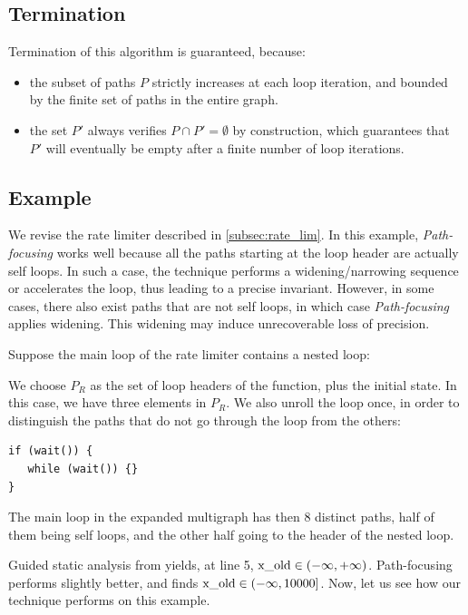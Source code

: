\documentclass[preprint]{sigplanconf}
\begin{document}
\subsection{Termination}
Termination of this algorithm is guaranteed, because:
\begin{itemize}
\item 
the subset of paths $P$ strictly increases at each loop iteration, and bounded by the finite set of
paths in the entire graph. 
\item the set $P'$ always verifies $P \cap P' = \emptyset$ by construction, 
which guarantees that $P'$
will eventually be empty after a finite number of loop iterations.
\end{itemize}

\subsection{Example}

We revise the rate limiter described in \ref{subsec:rate_lim}. In this example,
\emph{Path-focusing} works well because all the paths starting at the
loop header are actually self loops. In such a case, the technique performs a
widening/narrowing sequence or accelerates the loop, thus leading to a precise
invariant. However, in some cases, there also exist paths that are not
self loops, in which case \emph{Path-focusing} applies widening. 
This widening may induce unrecoverable loss of precision.

Suppose the main loop of the rate limiter contains a nested loop:


We choose $P_R$ as the set of loop headers of the function, plus the initial
state. In this case, we have three elements in $P_R$.
We also unroll the loop once, in order to distinguish the paths that do not go
through the loop from the others:
\begin{lstlisting}[numbers=none]
if (wait()) {
   while (wait()) {}
}
\end{lstlisting}

The main loop in the expanded multigraph has then 8 distinct paths, half of
them being self loops, and the other half going to the header of the nested loop.

Guided static analysis from \citet{DBLP:conf/sas/GopanR07} yields, at line 5,
$\lstinline|x_old| \in (-\infty,+\infty)$.
Path-focusing \citep{Monniaux_Gonnord_SAS11} performs slightly
better, and finds $\lstinline|x_old| \in (-\infty,10000]$.
Now, let us see how our technique performs on this example.
\end{document}
